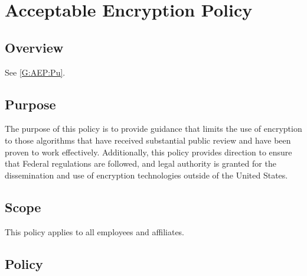 \chapter{Acceptable Encryption Policy}
\CommonIntroduction



\section{Overview}
See \vref{G:AEP:Pu}.



\section{Purpose}\label{G:AEP:Pu}
The purpose of this policy is to provide guidance that limits the use of encryption to those algorithms that have received substantial public review and have been proven to work effectively.
Additionally, this policy provides direction to ensure that Federal regulations are followed, and legal authority is granted for the dissemination and use of encryption technologies outside of the United States.



\section{Scope}
This policy applies to all \CompanyName{} employees and affiliates.



\section{Policy}


